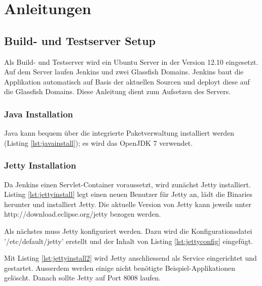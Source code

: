 \chapter{Anleitungen}

\section{Build- und Testserver Setup}

Als Build- und Testserver wird ein Ubuntu Server in der Version 12.10 eingesetzt. Auf dem Server laufen Jenkins und zwei Glassfish Domains. Jenkins baut die Applikation automatisch auf Basis der aktuellen Sourcen und deployt diese auf die Glassfish Domains. Diese Anleitung dient zum Aufsetzen des Servers.

\subsection{Java Installation}

Java kann bequem über die integrierte Paketverwaltung installiert werden (Listing \ref{lst:javainstall}); es wird das OpenJDK 7 verwendet.



\subsection{Jetty Installation}

Da Jenkins einen Servlet-Container voraussetzt, wird zunächst Jetty installiert. Listing \ref{lst:jettyinstall} legt einen neuen Benutzer für Jetty an, lädt die Binaries herunter und installiert Jetty. Die aktuelle Version von Jetty kann jeweils unter http://download.eclipse.org/jetty bezogen werden.



Als nächstes muss Jetty konfiguriert werden. Dazu wird die Konfigurationsdatei '/etc/default/jetty' erstellt und der Inhalt von Listing \ref{lst:jettyconfig} eingefügt.



Mit Listing \ref{lst:jettyinstall2} wird Jetty anschliessend als Service eingerichtet und gestartet. Ausserdem werden einige nicht benötigte Beispiel-Applikationen gelöscht. Danach sollte Jetty auf Port 8008 laufen.

